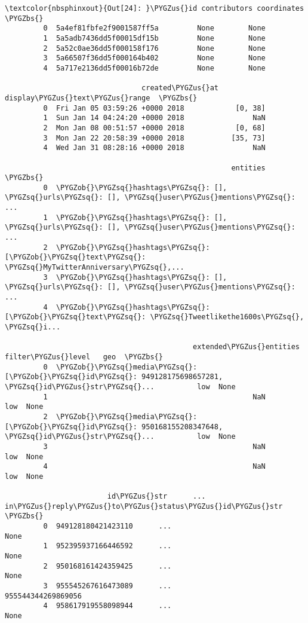 \documentclass[letterpaper,10pt,english]{sphinxmanual}
\begin{document}
%
\begin{Verbatim}[commandchars=\\\{\}]
\textcolor{nbsphinxout}{Out[24]: }\PYGZus{}id contributors coordinates  \PYGZbs{}
         0  5a4ef81fbfe2f9001587ff5a         None        None
         1  5a5adb7436dd5f00015df15b         None        None
         2  5a52c0ae36dd5f000158f176         None        None
         3  5a66507f36dd5f000164b402         None        None
         4  5a717e2136dd5f00016b72de         None        None
         
                                created\PYGZus{}at display\PYGZus{}text\PYGZus{}range  \PYGZbs{}
         0  Fri Jan 05 03:59:26 +0000 2018            [0, 38]
         1  Sun Jan 14 04:24:20 +0000 2018                NaN
         2  Mon Jan 08 00:51:57 +0000 2018            [0, 68]
         3  Mon Jan 22 20:58:39 +0000 2018           [35, 73]
         4  Wed Jan 31 08:28:16 +0000 2018                NaN
         
                                                     entities  \PYGZbs{}
         0  \PYGZob{}\PYGZsq{}hashtags\PYGZsq{}: [], \PYGZsq{}urls\PYGZsq{}: [], \PYGZsq{}user\PYGZus{}mentions\PYGZsq{}: ...
         1  \PYGZob{}\PYGZsq{}hashtags\PYGZsq{}: [], \PYGZsq{}urls\PYGZsq{}: [], \PYGZsq{}user\PYGZus{}mentions\PYGZsq{}: ...
         2  \PYGZob{}\PYGZsq{}hashtags\PYGZsq{}: [\PYGZob{}\PYGZsq{}text\PYGZsq{}: \PYGZsq{}MyTwitterAnniversary\PYGZsq{},...
         3  \PYGZob{}\PYGZsq{}hashtags\PYGZsq{}: [], \PYGZsq{}urls\PYGZsq{}: [], \PYGZsq{}user\PYGZus{}mentions\PYGZsq{}: ...
         4  \PYGZob{}\PYGZsq{}hashtags\PYGZsq{}: [\PYGZob{}\PYGZsq{}text\PYGZsq{}: \PYGZsq{}Tweetlikethe1600s\PYGZsq{}, \PYGZsq{}i...
         
                                            extended\PYGZus{}entities filter\PYGZus{}level   geo  \PYGZbs{}
         0  \PYGZob{}\PYGZsq{}media\PYGZsq{}: [\PYGZob{}\PYGZsq{}id\PYGZsq{}: 949128175698657281, \PYGZsq{}id\PYGZus{}str\PYGZsq{}...          low  None
         1                                                NaN          low  None
         2  \PYGZob{}\PYGZsq{}media\PYGZsq{}: [\PYGZob{}\PYGZsq{}id\PYGZsq{}: 950168155208347648, \PYGZsq{}id\PYGZus{}str\PYGZsq{}...          low  None
         3                                                NaN          low  None
         4                                                NaN          low  None
         
                        id\PYGZus{}str      ...       in\PYGZus{}reply\PYGZus{}to\PYGZus{}status\PYGZus{}id\PYGZus{}str  \PYGZbs{}
         0  949128180421423110      ...                            None
         1  952395937166446592      ...                            None
         2  950168161424359425      ...                            None
         3  955545267616473089      ...              955544344269869056
         4  958617919558098944      ...                            None
         

\end{Verbatim}
\end{document}
